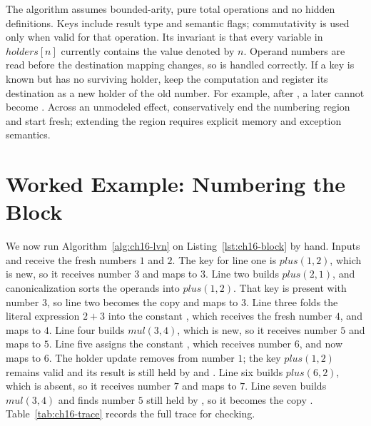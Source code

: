 The algorithm assumes bounded-arity, pure total operations and no hidden definitions.
Keys include result type and semantic flags; commutativity is used only when valid for that operation.
Its invariant is that every variable in $holders[n]$ currently contains the value denoted by $n$.
Operand numbers are read before the destination mapping changes, so  is handled correctly.
If a key is known but has no surviving holder, keep the computation and register its destination as a new holder of the old number.
For example, after , a later  cannot become .
Across an unmodeled effect, conservatively end the numbering region and start fresh; extending the region requires explicit memory and exception semantics.

\section{Worked Example: Numbering the Block}
\label{sec:ch16-worked-numbering}

We now run Algorithm~\ref{alg:ch16-lvn} on Listing~\ref{lst:ch16-block} by hand.
Inputs  and  receive the fresh numbers $1$ and $2$.
The key for line one is $plus(1, 2)$, which is new, so it receives number $3$ and  maps to $3$.
Line two builds $plus(2, 1)$, and canonicalization sorts the operands into $plus(1, 2)$.
That key is present with number $3$, so line two becomes the copy  and  maps to $3$.
Line three folds the literal expression $2+3$ into the constant , which receives the fresh number $4$, and  maps to $4$.
Line four builds $mul(3, 4)$, which is new, so it receives number $5$ and  maps to $5$.
Line five assigns the constant , which receives number $6$, and  now maps to $6$.
The holder update removes  from number $1$; the key $plus(1,2)$ remains valid and its result is still held by  and .
Line six builds $plus(6, 2)$, which is absent, so it receives number $7$ and  maps to $7$.
Line seven builds $mul(3,4)$ and finds number $5$ still held by , so it becomes the copy .
Table~\ref{tab:ch16-trace} records the full trace for checking.


